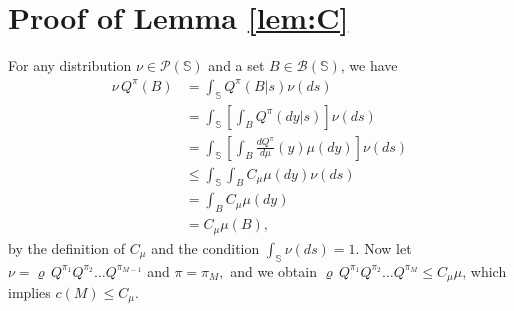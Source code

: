 \documentclass[12pt,technote,onecolumn]{IEEEtran}
\begin{document}
\section*{Proof of Lemma \ref{lem:C}}
\begin{IEEEproof}
	For any distribution $\nu\in\mathcal{P}\left(\mathbb{S}\right)$
	and a set $B\in\mathcal{B}\left(\mathbb{S}\right)$, we have
	\begin{align*}
	\nu\,Q^{\pi}\left(B\right) & =\int_{\mathbb{S}}Q^{\pi}\left(B|s\right)\nu\left(ds\right)\\
	& =\int_{\mathbb{S}}\left[\int_{B}Q^{\pi}\left(dy|s\right)\right]\nu\left(ds\right)\\
	& =\int_{\mathbb{S}}\left[\int_{B}\frac{dQ^{\pi}}{d\mu}\left(y\right)\mu\left(dy\right)\right]\nu\left(ds\right)\\
	& \leq\int_{\mathbb{S}}\int_{B}C_{\mu}\mu\left(dy\right)\nu\left(ds\right)\\
	& =\int_{B}C_{\mu}\mu\left(dy\right)\\
	& =C_{\mu}\mu\left(B\right),
	\end{align*}
	by the definition of $C_{\mu}$ and the condition $\int_{\mathbb{S}}\nu\left(ds\right)=1.$
	Now let $\nu=\varrho\,Q^{\pi_{1}}Q^{\pi_{2}}\dots Q^{\pi_{M-1}}$
	and $\pi=\pi_{M},$ and we obtain $\varrho\,Q^{\pi_{1}}Q^{\pi_{2}}\dots Q^{\pi_{M}}\leq C_{\mu}\mu$,
	which implies $c\left(M\right)\leq C_{\mu}.$ 
\end{IEEEproof}
\end{document}
